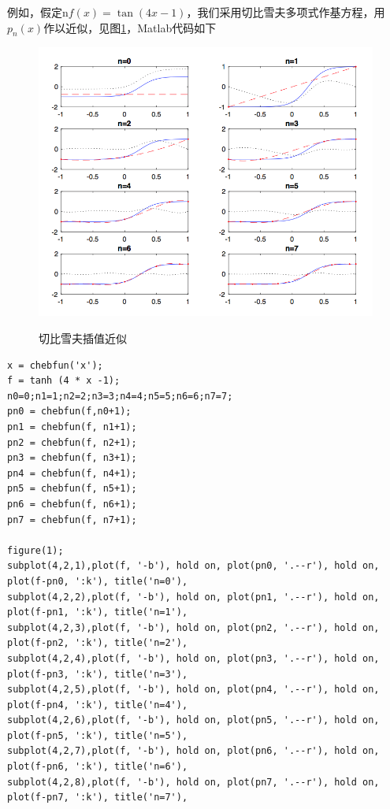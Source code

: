 \begin{subappendices}
例如，假定n$f(x) = \tan (4x-1)$，我们采用切比雪夫多项式作基方程，用$p_n(x)$作以近似，见图\ref{fig:poly-interpolation-simulation}，Matlab代码如下
\begin{figure}[ht]
   \caption{切比雪夫插值近似}
  \centering
  \includegraphics[width=15cm]{./Figures/20170926-interpolation-simulation}
  \label{fig:poly-interpolation-simulation}
%
\end{figure}

\begin{verbatim}
x = chebfun('x');
f = tanh (4 * x -1);
n0=0;n1=1;n2=2;n3=3;n4=4;n5=5;n6=6;n7=7;
pn0 = chebfun(f,n0+1);
pn1 = chebfun(f, n1+1);
pn2 = chebfun(f, n2+1);
pn3 = chebfun(f, n3+1);
pn4 = chebfun(f, n4+1);
pn5 = chebfun(f, n5+1);
pn6 = chebfun(f, n6+1);
pn7 = chebfun(f, n7+1);

figure(1);
subplot(4,2,1),plot(f, '-b'), hold on, plot(pn0, '.--r'), hold on, plot(f-pn0, ':k'), title('n=0'),
subplot(4,2,2),plot(f, '-b'), hold on, plot(pn1, '.--r'), hold on, plot(f-pn1, ':k'), title('n=1'),
subplot(4,2,3),plot(f, '-b'), hold on, plot(pn2, '.--r'), hold on, plot(f-pn2, ':k'), title('n=2'),
subplot(4,2,4),plot(f, '-b'), hold on, plot(pn3, '.--r'), hold on, plot(f-pn3, ':k'), title('n=3'),
subplot(4,2,5),plot(f, '-b'), hold on, plot(pn4, '.--r'), hold on, plot(f-pn4, ':k'), title('n=4'),
subplot(4,2,6),plot(f, '-b'), hold on, plot(pn5, '.--r'), hold on, plot(f-pn5, ':k'), title('n=5'),
subplot(4,2,7),plot(f, '-b'), hold on, plot(pn6, '.--r'), hold on, plot(f-pn6, ':k'), title('n=6'),
subplot(4,2,8),plot(f, '-b'), hold on, plot(pn7, '.--r'), hold on, plot(f-pn7, ':k'), title('n=7'),
\end{verbatim}


\end{subappendices}
